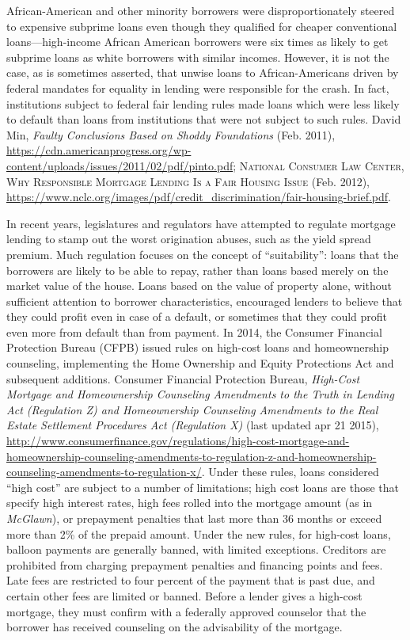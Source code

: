 \item African-American and other minority borrowers were disproportionately
steered to expensive subprime loans even though they qualified for cheaper
conventional loans---high-income African American borrowers were six times as
likely to get subprime loans as white borrowers with similar incomes.  However,
it is not the case, as is sometimes asserted, that unwise loans to
African-Americans driven by federal mandates for equality in lending were
responsible for the crash.  In fact, institutions subject to federal fair
lending rules made loans which were less likely to default than loans from
institutions that were not subject to such rules.  David Min,
\emph{Faulty
Conclusions Based on Shoddy Foundations} (Feb. 2011),
\url{https://cdn.americanprogress.org/wp-content/uploads/issues/2011/02/pdf/pinto.pdf};
\textsc{National Consumer Law Center},
\textsc{Why
Responsible Mortgage Lending Is a Fair Housing Issue} (Feb. 2012),
\url{https://www.nclc.org/images/pdf/credit_discrimination/fair-housing-brief.pdf}.


\item In recent years, legislatures and regulators have attempted to regulate
mortgage lending to stamp out the worst origination abuses, such as the yield
spread premium.  Much regulation focuses on the concept of ``suitability'':
loans that the borrowers are likely to be able to repay, rather than loans
based merely on the market value of the house. Loans based on the value of
property alone, without sufficient attention to borrower characteristics,
encouraged lenders to believe that they could profit even in case of a default,
or sometimes that they could profit even more from default than from payment. 
In 2014, the Consumer Financial Protection Bureau (CFPB) issued rules on
high-cost
loans and homeownership counseling, implementing the Home Ownership and Equity
Protections Act and subsequent additions.
Consumer Financial Protection Bureau, \emph{High-Cost Mortgage and Homeownership
Counseling Amendments to the Truth in Lending Act (Regulation Z) and
Homeownership Counseling Amendments to the Real Estate Settlement Procedures Act
(Regulation X)} (last updated apr 21 2015),
\url{http://www.consumerfinance.gov/regulations/high-cost-mortgage-and-homeownership-counseling-amendments-to-regulation-z-and-homeownership-counseling-amendments-to-regulation-x/}.
Under these rules, loans considered ``high cost'' are subject to a number of
limitations; high cost loans are those that specify high interest rates, high
fees rolled into the mortgage amount (as in \textit{McGlawn}), or prepayment
penalties that last more than 36 months or exceed more than 2\% of the prepaid
amount.  Under the new rules, for high-cost loans, balloon payments are
generally banned, with limited exceptions.  Creditors are prohibited from
charging prepayment penalties and financing points and fees.  Late fees are
restricted to four percent of the payment that is past due, and certain other
fees are limited or banned.  Before a lender gives a high-cost mortgage, they
must confirm with a federally approved counselor that the borrower has received
counseling on the advisability of the mortgage.


